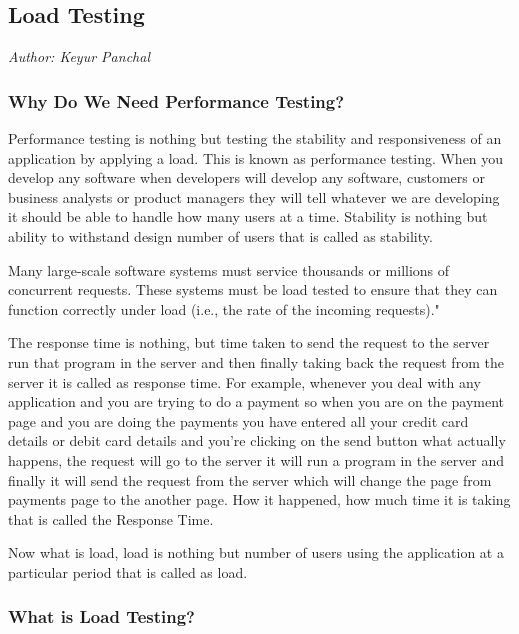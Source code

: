 

\subsection{Load Testing}\label{sec:Load Testing}

\textit{Author: Keyur Panchal}

\subsubsection{Why Do We Need Performance Testing?}

Performance testing is nothing but testing the stability and responsiveness of an application
by applying a load. This is known as performance testing. When you develop
any software when developers will develop any software, customers or business analysts
or product managers they will tell whatever we are developing it should be able to handle
how many users at a time. Stability is nothing but ability to withstand design number of
users that is called as stability.

Many large-scale software systems must service thousands or millions of concurrent requests.
These systems must be load tested to ensure that they can function correctly
under load (i.e., the rate of the incoming requests)." \cite{7123673}

The response time is nothing, but time taken to send the request to the server run that
program in the server and then finally taking back the request from the server it is called
as response time. For example, whenever you deal with any application and you are trying
to do a payment so when you are on the payment page and you are doing the payments
you have entered all your credit card details or debit card details and you're clicking on the
send button what actually happens, the request will go to the server it will run a program
in the server and finally it will send the request from the server which will change the
page from payments page to the another page. How it happened, how much time it is
taking that is called the Response Time.


Now what is load, load is nothing but number of users using the application at a particular period that is called as load.

\subsubsection{What is Load Testing?}


